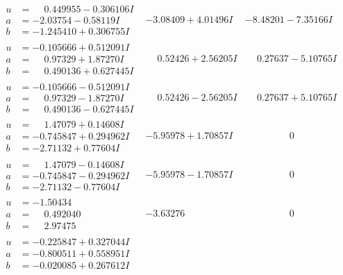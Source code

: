 \documentclass[1p]{elsarticle_modified}
\theoremstyle{definition}
\begin{document}
$$\begin{array}{c|c|c}
\begin{aligned}
u &= \phantom{-}0.449955 - 0.306106 I \\
a &= -2.03754 - 0.58119 I \\
b &= -1.245410 + 0.306755 I\end{aligned}
 & -3.08409 + 4.01496 I & -8.48201 - 7.35166 I \\ \hline\begin{aligned}
u &= -0.105666 + 0.512091 I \\
a &= \phantom{-}0.97329 + 1.87270 I \\
b &= \phantom{-}0.490136 + 0.627445 I\end{aligned}
 & \phantom{-}0.52426 + 2.56205 I & \phantom{-}0.27637 - 5.10765 I \\ \hline\begin{aligned}
u &= -0.105666 - 0.512091 I \\
a &= \phantom{-}0.97329 - 1.87270 I \\
b &= \phantom{-}0.490136 - 0.627445 I\end{aligned}
 & \phantom{-}0.52426 - 2.56205 I & \phantom{-}0.27637 + 5.10765 I \\ \hline\begin{aligned}
u &= \phantom{-}1.47079 + 0.14608 I \\
a &= -0.745847 + 0.294962 I \\
b &= -2.71132 + 0.77604 I\end{aligned}
 & -5.95978 + 1.70857 I & \phantom{-0.000000 } 0 \\ \hline\begin{aligned}
u &= \phantom{-}1.47079 - 0.14608 I \\
a &= -0.745847 - 0.294962 I \\
b &= -2.71132 - 0.77604 I\end{aligned}
 & -5.95978 - 1.70857 I & \phantom{-0.000000 } 0 \\ \hline\begin{aligned}
u &= -1.50434\phantom{ +0.000000I} \\
a &= \phantom{-}0.492040\phantom{ +0.000000I} \\
b &= \phantom{-}2.97475\phantom{ +0.000000I}\end{aligned}
 & -3.63276\phantom{ +0.000000I} & \phantom{-0.000000 } 0 \\ \hline\begin{aligned}
u &= -0.225847 + 0.327044 I \\
a &= -0.800511 + 0.558951 I \\
b &= -0.020085 + 0.267612 I\end{aligned}

\end{array}$$
\end{document}
